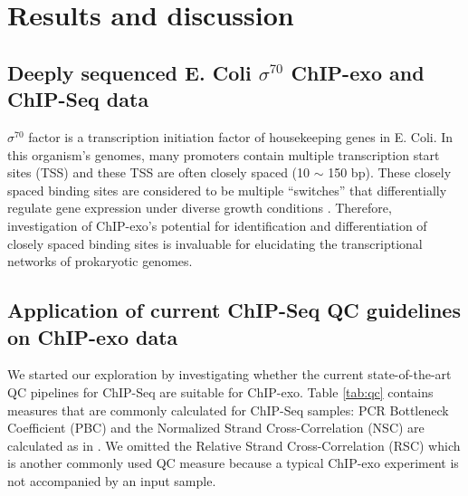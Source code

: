 \documentclass{bmcart}\usepackage[]{graphicx}\usepackage[]{color}
\newcommand{\sig}{\sigma^{70}}
\begin{document}
\section{Results and discussion}
\label{sec:results}

\subsection{Deeply sequenced E. Coli $\sig$ ChIP-exo and ChIP-Seq data}
 
$\sig$ factor is a transcription initiation factor of housekeeping
genes in E. Coli. In this organism's genomes, many promoters contain
multiple transcription start sites (TSS) and these TSS are often
closely spaced (10 $\sim$ 150 bp). These closely spaced binding sites
are considered to be multiple ``switches'' that differentially
regulate gene expression under diverse growth conditions
\cite{regulondb}. Therefore, investigation of ChIP-exo's potential for
identification and differentiation of closely spaced binding sites is
invaluable for elucidating the transcriptional networks of prokaryotic
genomes.

\subsection{Application of current ChIP-Seq QC guidelines on ChIP-exo
  data}

We started our exploration by investigating whether the current
state-of-the-art QC pipelines for ChIP-Seq are suitable for
ChIP-exo. Table \ref{tab:qc} contains measures that are commonly
calculated for ChIP-Seq samples: PCR Bottleneck Coefficient (PBC) and
the Normalized Strand Cross-Correlation (NSC) are calculated as in
\cite{encode_qc}. We omitted the Relative Strand Cross-Correlation
(RSC) which is another commonly used QC measure because a typical
ChIP-exo experiment is not accompanied by an input sample.

\end{document}

